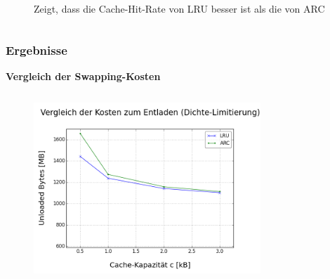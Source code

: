 \documentclass[presentation]{beamer}
\begin{document}
\begin{frame}
\begin{columns}[c]
\begin{figure}
			\caption{Zeigt, dass die Cache-Hit-Rate von LRU besser ist als die von ARC}
			\label{fig:sub7}
		\end{figure}
	\end{columns}
\end{frame}

 
\begin{frame}
\frametitle{Ergebnisse}
\baselineskip
\color{dd-gray} \textbf{Vergleich der Swapping-Kosten} \color{black}
\begin{columns}[c] %
	\begin{figure}
		\centering
		\includegraphics[width=1\linewidth]{figures/results/DensityLimitationSwapUnloadCosts.png}
		\caption{}
		\label{fig:sub8}
	\end{figure}
	\begin{figure}
	\centering

\end{figure}
\end{columns}
\end{frame}
\end{document}
